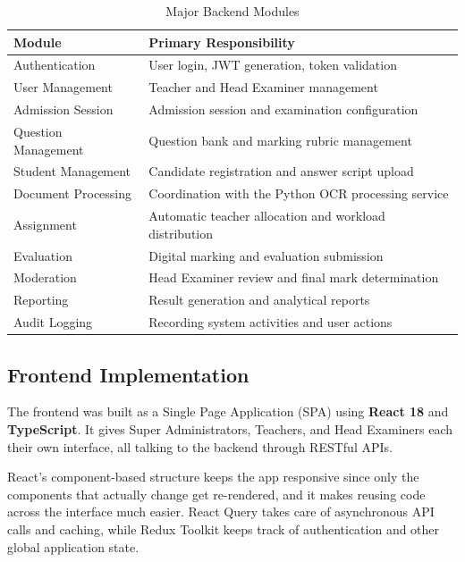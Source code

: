 \begin{table}[H]
\centering
\caption{Major Backend Modules}
\label{tab:backend_modules}

\begin{tabular}{|p{5cm}|p{8cm}|}
\hline
\textbf{Module} & \textbf{Primary Responsibility} \\
\hline
Authentication & User login, JWT generation, token validation \\
\hline
User Management & Teacher and Head Examiner management \\
\hline
Admission Session & Admission session and examination configuration \\
\hline
Question Management & Question bank and marking rubric management \\
\hline
Student Management & Candidate registration and answer script upload \\
\hline
Document Processing & Coordination with the Python OCR processing service \\
\hline
Assignment & Automatic teacher allocation and workload distribution \\
\hline
Evaluation & Digital marking and evaluation submission \\
\hline
Moderation & Head Examiner review and final mark determination \\
\hline
Reporting & Result generation and analytical reports \\
\hline
Audit Logging & Recording system activities and user actions \\
\hline
\end{tabular}

\end{table}

\subsection{Frontend Implementation}

The frontend was built as a Single Page Application (SPA) using \textbf{React 18} and \textbf{TypeScript}. It gives Super Administrators, Teachers, and Head Examiners each their own interface, all talking to the backend through RESTful APIs.

React's component-based structure keeps the app responsive since only the components that actually change get re-rendered, and it makes reusing code across the interface much easier. React Query takes care of asynchronous API calls and caching, while Redux Toolkit keeps track of authentication and other global application state.

